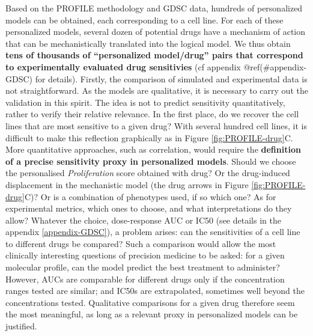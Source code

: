 \documentclass[a4paper,12pt,twoside,onecolumn,openright,final,oldfontcommands]{memoir}
\begin{document}
Based on the PROFILE methodology and GDSC data, hundreds of personalized
models can be obtained, each corresponding to a cell line. For each of
these personalized models, several dozen of potential drugs have a
mechanism of action that can be mechanistically translated into the
logical model. We thus obtain \textbf{tens of thousands of
``personalized model/drug'' pairs that correspond to experimentally
evaluated drug sensitivies} (cf appendix @ref(\#appendix-GDSC) for
details). Firstly, the comparison of simulated and experimental data is
not straightforward. As the models are qualitative, it is necessary to
carry out the validation in this spirit. The idea is not to predict
sensitivity quantitatively, rather to verify their relative relevance.
In the first place, do we recover the cell lines that are most sensitive
to a given drug? With several hundred cell lines, it is difficult to
make this reflection graphically as in Figure \ref{fig:PROFILE-drug}C.
More quantitative approaches, such as correlation, would require the
\textbf{definition of a precise sensitivity proxy in personalized
models}. Should we choose the personalised \emph{Proliferation} score
obtained with drug? Or the drug-induced displacement in the mechanistic
model (the drug arrows in Figure \ref{fig:PROFILE-drug}C)? Or is a
combination of phenotypes used, if so which one? As for experimental
metrics, which ones to choose, and what interpretations do they allow?
Whatever the choice, dose-response AUC or IC50 (see details in the
appendix \ref{appendix-GDSC}), a problem arises: can the sensitivities
of a cell line to different drugs be compared? Such a comparison would
allow the most clinically interesting questions of precision medicine to
be asked: for a given molecular profile, can the model predict the best
treatment to administer? However, AUCs are comparable for different
drugs only if the concentration ranges tested are similar; and IC50s are
extrapolated, sometimes well beyond the concentrations tested.
Qualitative comparisons for a given drug therefore seem the most
meaningful, as long as a relevant proxy in personalized models can be
justified.
\end{document}
